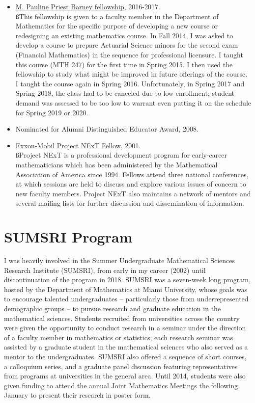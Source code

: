 \documentclass[overlapped,line,letterpaper]{res}
\begin{document}
\begin{resume}
\begin{itemize}
\item
\underline{M. Pauline Priest Barney fellowship}, 2016-2017. \\
{\ss \indent This fellowship is given to a faculty member in the Department of Mathematics for the specific purpose of developing a new course or redesigning an existing mathematics course.  In Fall 2014, I was asked to develop a course to prepare Actuarial Science minors for the second exam (Financial Mathematics) in the sequence for professional licensure.  I taught this course (MTH 247) for the first time in Spring 2015.  I then used the fellowship to study what might be improved in future offerings of the course.  I taught the course again in Spring 2016.  Unfortunately, in Spring 2017 and Spring 2018, the class had to be canceled due to low enrollment; student demand was assessed to be too low to warrant even putting it on the schedule for Spring 2019 or 2020.}

\item
Nominated for Alumni Distinguished Educator Award, 2008.

\item
\underline{Exxon-Mobil Project NExT Fellow}, 2001. \\
{\ss Project NExT is a professional development program for early-career mathematicians which has been administered by the Mathematical Association of America since 1994.  Fellows attend three national conferences, at which sessions are held to discuss and explore various issues of concern to new faculty members.  Project NExT also maintains a network of mentors and several mailing lists for further discussion and dissemination of information.}  

\end{itemize}

\large
\section{\bf SUMSRI Program}
\vspace {3 mm}
\normalsize

I was heavily involved in the Summer Undergraduate Mathematical Sciences Research Institute (SUMSRI), from early in my career (2002) until discontinuation of the program in 2018.  SUMSRI was a seven-week long program, hosted by the Department of Mathematics at Miami University, whose goals was to encourage talented undergraduates -- particularly those from underrepresented demographic groups -- to pursue research and graduate education in the mathematical sciences.  Students recruited from universities across the country were given the opportunity to conduct research in a seminar under the direction of a faculty member in mathematics or statistics; each research seminar was assisted by a graduate student in the mathematical sciences who also served as a mentor to the undergraduates.  SUMSRI also offered a sequence of short courses, a colloquium series, and a graduate panel discussion featuring representatives from programs at universities in the general area.  Until 2014, students were also given funding to attend the annual Joint Mathematics Meetings the following January to present their research in poster form.  


\end{resume}
\end{document}
